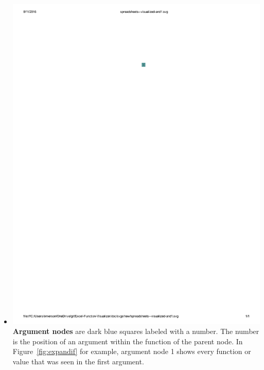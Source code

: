 \documentclass[conference]{IEEEtran}
\begin{document}
\begin{itemize}
		\item  \vspace{.25cm} \includegraphics{glossary-blue} \textbf{Argument nodes}
		are dark blue squares labeled with a number. The number is the position of an
		argument within the function of the parent node. In Figure~\ref{fig:expandif}
		for example, argument node 1 shows every function or value that was seen in
		the first argument.
		

\end{itemize}
\end{document}
